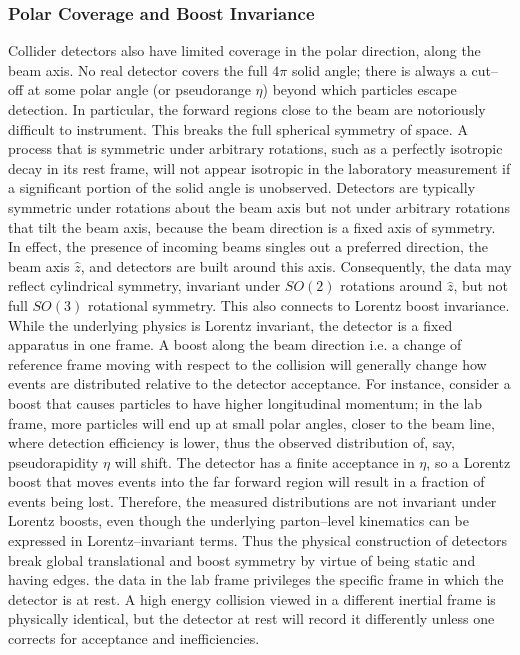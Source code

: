        \subsubsection{Polar Coverage and Boost Invariance}
            Collider detectors also have limited coverage in the polar direction, along the beam axis.
            No real detector covers the full $4\pi$ solid angle;
            there is always a cut--off at some polar angle (or pseudorange $\eta$) beyond which particles escape detection.
            In particular, the forward regions close to the beam are notoriously difficult to instrument.
            This breaks the full spherical symmetry of space.
            A process that is symmetric under arbitrary rotations, such as a perfectly isotropic decay in its rest frame, will not appear isotropic in the laboratory measurement if a significant portion of the solid angle is unobserved.
            Detectors are typically symmetric under rotations about the beam axis but not under arbitrary rotations that tilt the beam axis, because the beam direction is a fixed axis of symmetry.
            In effect, the presence of incoming beams singles out a preferred direction, the beam axis $\hat{z}$, and detectors are built around this axis. Consequently, the data may reflect cylindrical symmetry, invariant under \(SO(2)\) rotations around $\hat{z}$, but not full $SO(3)$ rotational symmetry.
            This also connects to Lorentz boost invariance.
            While the underlying physics is Lorentz invariant, the detector is a fixed apparatus in one frame.
            A boost along the beam direction i.e. a change of reference frame moving with respect to the collision will generally change how events are distributed relative to the detector acceptance.
            For instance, consider a boost that causes particles to have higher longitudinal momentum;
            in the lab frame, more particles will end up at small polar angles, closer to the beam line, where detection efficiency is lower, thus the observed distribution of, say, pseudorapidity $\eta$ will shift.
            The detector has a finite acceptance in $\eta$, so a Lorentz boost that moves events into the far forward region will result in a fraction of events being lost.
            Therefore, the measured distributions are not invariant under Lorentz boosts, even though the underlying parton--level kinematics can be expressed in Lorentz--invariant terms.
            Thus the physical construction of detectors break global translational and boost symmetry by virtue of being static and having edges.
            the data in the lab frame privileges the specific frame in which the detector is at rest.
            A high energy collision viewed in a different inertial frame is physically identical, but the detector at rest will record it differently unless one corrects for acceptance and inefficiencies.


